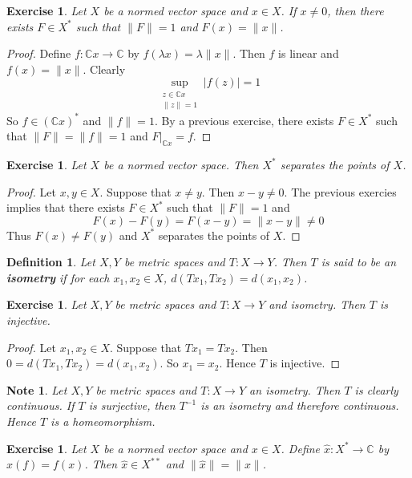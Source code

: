 \documentclass[12pt]{amsart}
\newtheorem{defn}[thm]{Definition}
\newtheorem{note}[thm]{Note}
\newtheorem{ex}[thm]{Exercise}
\newcommand{\lam}{\lambda}
\newcommand{\C}{\mathbb{C}}
\begin{document}
	\begin{ex}
		Let $X$ be a normed vector space and $x \in X$. If $x \neq 0$, then there exists $F \in X^*$ such that $\|F \|= 1$ and $F(x) = \|x \|$.
	\end{ex}
	
	\begin{proof}
		Define $f:\C x \rightarrow \C$ by $f(\lam x) = \lam \|x \|$. Then $f$ is linear and $f(x) = \|x \|$. Clearly $$\sup_{\substack{z \in \C x \\ \|z \|=1}}\vert f(z) \vert = 1$$ 
		So $f \in (\C x)^*$ and $\|f \|= 1$. By a previous exercise, there exists $F \in X^*$ such that $\|F \|= \|f \|=1$ and $F|_{\C x} = f$. 
	\end{proof}
	
	\begin{ex}
		Let $X$ be a normed vector space. Then $X^*$ separates the points of $X$. 
	\end{ex}
	
	\begin{proof}
		Let $x, y \in X$. Suppose that $x \neq y$. Then $x-y \neq 0$. The previous exercies implies that there exists $F \in X^*$ such that $\|F \|= 1$ and $$F(x) - F(y) = F(x-y) = \|x-y \|\neq 0$$ Thus $F(x) \neq F(y)$ and $X^*$ separates the points of $X$.
	\end{proof}
	
	\begin{defn}
		Let $X, Y$ be metric spaces and $T : X \rightarrow Y$. Then $T$ is said to be an \textbf{isometry} if for each $x_1, x_2 \in X$, $d( Tx_1, Tx_2) = d(x_1,x_2) $.
	\end{defn}
	
	\begin{ex}
		Let $X,Y$ be metric spaces and $T:X \rightarrow Y$ and isometry. Then $T$ is injective.
	\end{ex}
	
	\begin{proof}
		Let $x_1, x_2 \in X$. Suppose that $Tx_1=Tx_2$. Then $0= d( Tx_1, Tx_2) = d(x_1,x_2)$. So $x_1 = x_2$. Hence $T$ is injective.
	\end{proof}
	
	\begin{note}
		Let $X,Y$ be metric spaces and $T:X \rightarrow Y$ an isometry. Then $T$ is clearly continuous. If $T$ is surjective, then $T^{-1}$ is an isometry and therefore continuous. Hence $T$ is a homeomorphism.
	\end{note}
	
	\begin{ex}
		Let $X$ be a normed vector space and $x \in X$. Define $\hat{x}:X^* \rightarrow \C$ by $\hat{x}(f) = f(x)$. Then $\hat{x} \in X^{**}$ and $\|\hat{x} \|= \|x \|$.
	\end{ex}
	
\end{document}
